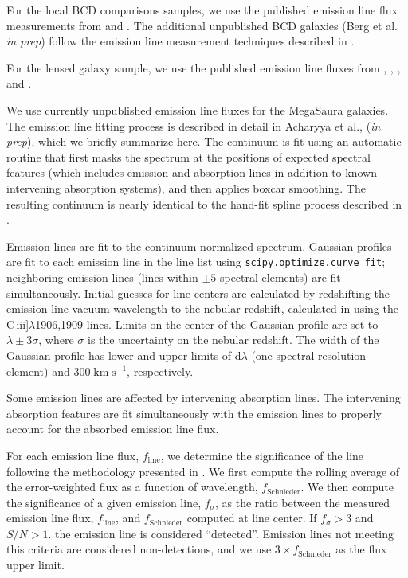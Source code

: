\documentclass[preprint2]{aastex62}
\newcommand{\ciii}{C\,{\sc iii}]\xspace}
\newcommand{\kms}{\ensuremath{\;\mathrm{km}\;\mathrm{s}^{-1}}\xspace}
\newcommand{\mage}{{\sc Meg}a{\sc S}a{\sc ura}\xspace}
\begin{document}
For the local BCD comparisons samples, we use the published emission line flux measurements from \citet{Berg+2016} and \citet{Senchyna+2017}. The additional unpublished BCD galaxies (Berg et al. \emph{in prep}) follow the emission line measurement techniques described in \citet{Berg+2016}.

For the lensed galaxy sample, we use the published emission line fluxes from \citet{Erb+2010}, \citet{Christensen+2012}, \citet{Stark+2014}, and \citet{Berg+2018}.

We use currently unpublished emission line fluxes for the \mage galaxies. The emission line fitting process is described in detail in Acharyya et al., (\emph{in prep}), which we briefly summarize here. The continuum is fit using an automatic routine that first masks the spectrum at the positions of expected spectral features (which includes emission and absorption lines in addition to known intervening absorption systems), and then applies boxcar smoothing. The resulting continuum is nearly identical to the hand-fit spline process described in \citet{Rigby+2018a}.

Emission lines are fit to the continuum-normalized spectrum. Gaussian profiles are fit to each emission line in the line list using {\tt scipy.optimize.curve\_fit}; neighboring emission lines (lines within $\pm 5$ spectral elements) are fit simultaneously. Initial guesses for line centers are calculated by redshifting the emission line vacuum wavelength to the nebular redshift, calculated in \citet{Rigby+2018a} using the \ciii$\lambda$1906,1909 lines. Limits on the center of the Gaussian profile are set to $\lambda \pm 3\sigma$, where $\sigma$ is the uncertainty on the nebular redshift. The width of the Gaussian profile has lower and upper limits of d$\lambda$ (one spectral resolution element) and 300\kms, respectively.

Some emission lines are affected by intervening absorption lines. The intervening absorption features are fit simultaneously with the emission lines to properly account for the absorbed emission line flux.

For each emission line flux, $f_{\mathrm{line}}$, we determine the significance of the line following the methodology presented in \citet{Schnieider+1993}. We first compute the rolling average of the error-weighted flux as a function of wavelength, $f_{\mathrm{Schnieder}}$. We then compute the significance of a given emission line, $f_{\sigma}$, as the ratio between the measured emission line flux, $f_{\mathrm{line}}$, and $f_{\mathrm{Schnieder}}$ computed at line center. If $f_{\sigma}>3$ and $S/N > 1$. the emission line is considered ``detected''. Emission lines not meeting this criteria are considered non-detections, and we use $3\times f_{\mathrm{Schnieder}}$ as the flux upper limit.
\end{document}
